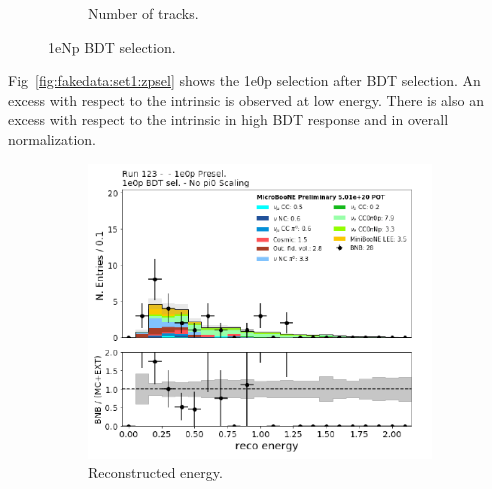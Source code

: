 \begin{figure}[H]
\begin{center}
\begin{subfigure}[b]{0.45\textwidth}
    \caption{\label{fig:fakedata:set1:Np_postsel_ntracks} Number of tracks.}
    \end{subfigure}
\caption{\label{fig:fakedata:set1:npsel} 1eNp BDT selection.}
\end{center}
\end{figure}

Fig~\ref{fig:fakedata:set1:zpsel} shows the 1e0p selection after BDT selection.  An excess with respect to the \nue intrinsic is observed at low energy. There is also an excess with respect to the \nue intrinsic in high BDT response and in overall normalization.

\begin{figure}[H] 
\begin{center}
    \begin{subfigure}[b]{0.3\textwidth}
    \centering
    \includegraphics[width=1.00\textwidth]{Fakedata/set1/zp_postsel_recoe.pdf}
    \caption{\label{fig:fakedata:set1:zp_postsel_recoe} Reconstructed energy.}
    \end{subfigure}
    \begin{subfigure}[b]{0.3\textwidth}
    \centering

\end{subfigure}
\end{center}
\end{figure}
